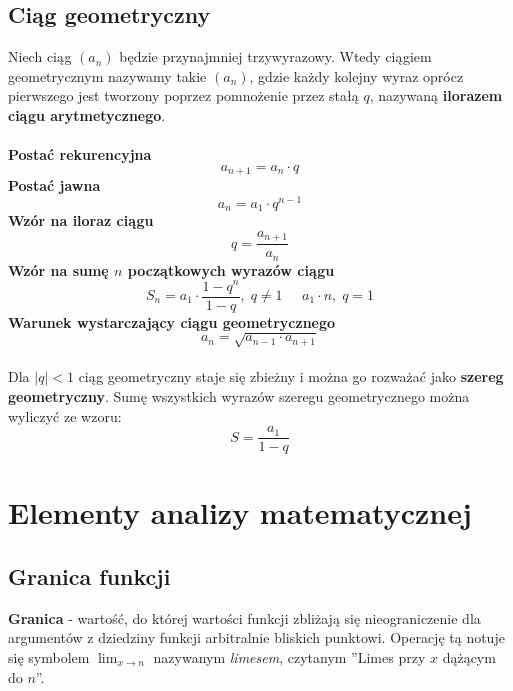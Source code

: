 \documentclass[14pt,a4paper]{extarticle}
\begin{document}
\subsection{Ciąg geometryczny}
\noindent Niech ciąg $(a_{n})$ będzie przynajmniej trzywyrazowy. Wtedy ciągiem geometrycznym nazywamy takie $(a_{n})$,
gdzie każdy kolejny wyraz oprócz pierwszego jest tworzony poprzez pomnożenie przez stałą $q$, nazywaną \textbf{ilorazem ciągu arytmetycznego}.\\\\
\noindent\textbf{Postać rekurencyjna}
$$a_{n+1} = a_{n}\cdot q$$
\noindent\textbf{Postać jawna}
$$a_{n} = a_{1} \cdot q^{n-1}$$
\noindent\textbf{Wzór na iloraz ciągu}
$$q = \dfrac{a_{n+1}}{a_{n}}$$
\noindent\textbf{Wzór na sumę $n$ początkowych wyrazów ciągu}
$$S_{n} = a_{1}\cdot\dfrac{1-q^{n}}{1-q},\; q \neq 1\;\;\;\;\; a_{1}\cdot n,\; q = 1$$
\noindent\textbf{Warunek wystarczający ciągu geometrycznego}
$$a_{n} = \sqrt{a_{n-1}\cdot a_{n+1}}$$
\\

\noindent Dla $\vert q\vert < 1$ ciąg geometryczny staje się zbieżny i można go rozważać jako \textbf{szereg geometryczny}.
Sumę wszystkich wyrazów szeregu geometrycznego można wyliczyć ze wzoru:
$$S = \dfrac{a_{1}}{1-q}$$

\newpage






\section{Elementy analizy matematycznej}
\subsection{Granica funkcji}
\noindent\textbf{Granica} - wartość, do której wartości funkcji zbliżają się nieograniczenie dla argumentów
z dziedziny funkcji arbitralnie bliskich punktowi. Operację tą notuje się symbolem $\displaystyle\lim_{x\to n}$ nazywanym \textit{limesem}, czytanym ''Limes przy $x$ dążącym do $n$''.\hfill\break\\
\end{document}

